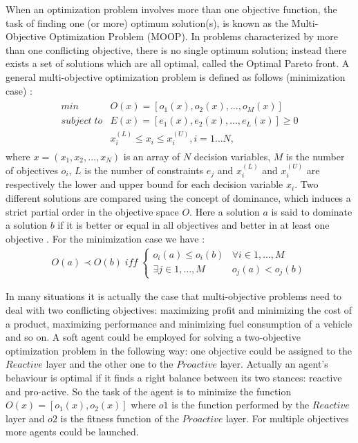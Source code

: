 When an optimization problem involves more than one objective function, the task of finding one (or more) optimum
solution(s), is known as the Multi-Objective Optimization Problem (MOOP). In problems characterized by more than one conflicting objective, there is no single optimum solution; instead there exists a set of solutions which are all optimal, called the Optimal Pareto front. A general multi-objective optimization problem is defined as follows (minimization case) \cite{Narzisi06Multiobjective}:
\begin{align}
\begin{array}{ll}
min & O(x)=[o_{1}(x), o_{2}(x), \ldots , o_{M}(x)] \\
subject \; to & E(x)=[e_{1}(x), e_{2}(x), \ldots , e_{L}(x)] \geq 0 \\
& x_{i}^{(L)} \leq x_{i} \leq x_{i}^{(U)} , i=1 \ldots N,
\end{array}
\end{align}
where $x=(x_{1},x_{2}, \ldots , x_{N})$ is an array of $N$ decision variables, $M$ is the number of objectives $o_{i}$,  $L$ is the number of constraints $e_{j}$ and $x_{i}^{(L)}$ and $x_{i}^{(U)}$ are respectively the lower and upper bound for each decision variable $x_{i}$. Two different solutions are compared using the concept of dominance, which induces a strict partial order in the objective space $O$. Here a solution $a$ is said to dominate a solution $b$ if it is better or equal in all objectives and better in at least one objective . For the minimization case we have \cite{Narzisi06Multiobjective}:
\begin{align}
O(a) \prec O(b) \; iff \; \left\{
\begin{array}{ll}
o_{i}(a) \leq o_{i}(b) & \forall i \in 1, \ldots , M \\
\exists j \in 1, \ldots , M & o_j(a) < o_{j}(b)
	\end{array}
\right.
\end{align}

In many situations it is actually the case that multi-objective problems need to deal with two conflicting objectives: maximizing profit and minimizing the cost of a product, maximizing performance and minimizing fuel consumption of a vehicle and so on. A soft agent could be employed for solving a two-objective optimization problem in the following way: one objective could be assigned to the $Reactive$ layer and the other one to the $Proactive$ layer. Actually an agent's behaviour is optimal if it finds a right balance between its two stances: reactive and pro-active. So the task of the agent is to minimize the function $O(x)=[o_{1}(x), o_{2}(x)]$ where $o1$ is the function performed by the $Reactive$ layer and $o2$ is the fitness function of the $Proactive$ layer. 
For multiple objectives more agents could be launched.



